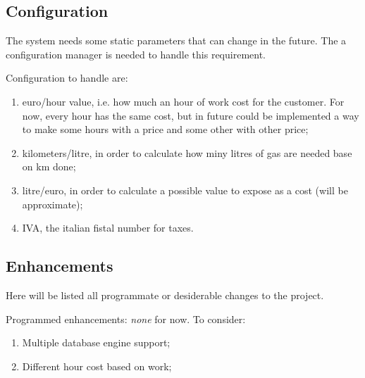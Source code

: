 \subsection{Configuration}
\label{subsec:configuration}
The system needs some static parameters that can change in the future. The a configuration manager is needed to handle this requirement.

Configuration to handle are:
\begin{enumerate}[label=(\alph*)]
\item euro/hour value, i.e. how much an hour of work cost for the customer. For now, every hour has the same cost, but in future could be implemented a way to make some hours with a price and some other with other price;
\item kilometers/litre, in order to calculate how miny litres of gas are needed base on km done;
\item litre/euro, in order to calculate a possible value to expose as a cost (will be approximate);
\item IVA, the italian fistal number for taxes.
\end{enumerate}


\subsection{Enhancements}
\label{subsec:enhancements}
Here will be listed all programmate or desiderable changes to the project.

Programmed enhancements: \textit{none} for now.
To consider: 
\begin{enumerate}[label=(\alph*)]
\item Multiple database engine support;
\item Different hour cost based on work;
\end{enumerate}

